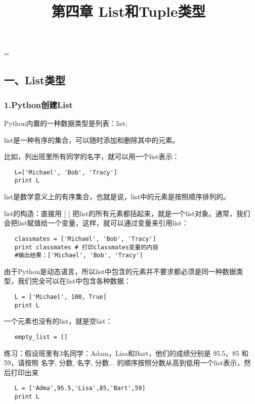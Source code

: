\documentclass{article}
\begin{document}
 
\hfuzz=\maxdimen
{}
\begin{CJK}{UTF8}{gbsn}  
\title{第四章 List和Tuple类型}
\author{}
\date{}
\maketitle
\part*{一、List类型}
\section*{1.Python创建List}
\subparagraph*{}
Python内置的一种数据类型是列表：list;
\subparagraph*{}
list是一种有序的集合，可以随时添加和删除其中的元素。
\subparagraph*{}
比如，列出班里所有同学的名字，就可以用一个list表示：
\begin{verbatim}
   L=['Michael', 'Bob', 'Tracy']
   print L
\end{verbatim}
\subparagraph*{}
list是数学意义上的有序集合，也就是说，list中的元素是按照顺序排列的。
\subparagraph*{}
list的构造：直接用 [ ] 把list的所有元素都括起来，就是一个list对象。通常，我们会把list赋值给一个变量，这样，就可以通过变量来引用list：
\begin{verbatim}
   classmates = ['Michael', 'Bob', 'Tracy']
   print classmates # 打印classmates变量的内容
   #输出结果：['Michael', 'Bob', 'Tracy']
\end{verbatim}
\subparagraph*{}
由于Python是动态语言，所以list中包含的元素并不要求都必须是同一种数据类型，我们完全可以在list中包含各种数据：
\begin{verbatim}
   L = ['Michael', 100, True]
   print L
\end{verbatim}
\subparagraph*{}
一个元素也没有的list，就是空list：
\begin{verbatim}
   empty_list = []
\end{verbatim}
\subparagraph*{}
练习：假设班里有3名同学：Adam，Lisa和Bart，他们的成绩分别是 95.5，85 和 59，请按照 名字, 分数, 名字, 分数... 的顺序按照分数从高到低用一个list表示，然后打印出来
\begin{verbatim}
   L = ['Adma',95.5,'Lisa',85,'Bart',59]
   print L
\end{verbatim}

\end{CJK}
\end{document}
